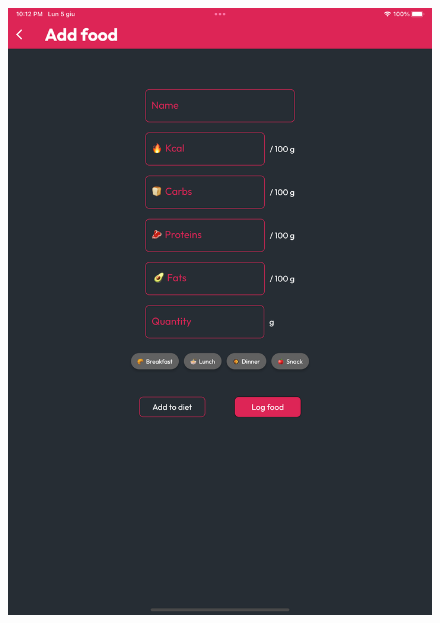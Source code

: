 \documentclass{Configuration_Files/PoliMi3i_thesis}
\begin{document}
\begin{figure}[!h]
  \centering
  \includegraphics[scale=0.1]{Images/Screenshots/Tablet/AddFoodTablet.png}

\end{figure}
\end{document}
